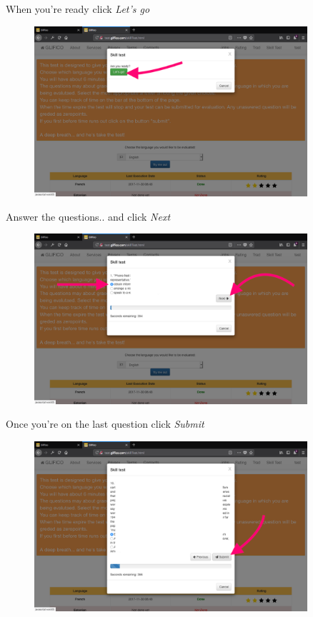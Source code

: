 \documentclass[11 pt, a4paper]{article}
\begin{document}
\clearpage
When you're ready click \textit{Let's go}
\begin{figure}[H]
\centering
\includegraphics[width=0.9\textwidth]{translator_skilltest4.png}
\end{figure}

Answer the questions.. and click \textit{Next}
\begin{figure}[H]
\centering
\includegraphics[width=0.9\textwidth]{translator_skilltest5.png}
\end{figure}


\clearpage
Once you're on the last question click \textit{Submit}
\begin{figure}[H]
\centering
\includegraphics[width=0.9\textwidth]{translator_skilltest6.png}
\end{figure}
\end{document}
